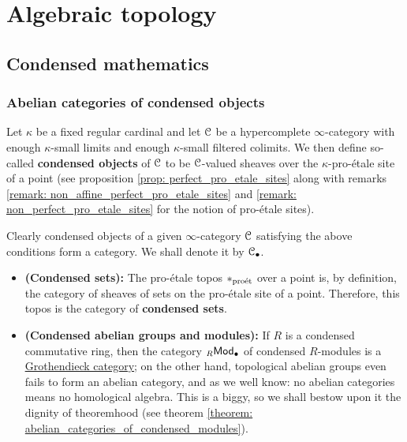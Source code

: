 \chapter{Algebraic topology}
    \begin{abstract}
        
    \end{abstract}
    
    \minitoc
    
    \section{Condensed mathematics} \label{section: condensed_mathematics}
        \subsection{Abelian categories of condensed objects}
            \begin{definition}[Condensation] \label{def: condensation}
                Let $\kappa$ be a fixed regular cardinal and let $\mathcal{C}$ be a hypercomplete $\infty$-category with enough $\kappa$-small limits and enough $\kappa$-small filtered colimits. We then define so-called \textbf{condensed objects} of $\mathcal{C}$ to be $\mathcal{C}$-valued sheaves over the $\kappa$-pro-\'etale site of a point (see proposition \ref{prop: perfect_pro_etale_sites} along with remarks \ref{remark: non_affine_perfect_pro_etale_sites} and \ref{remark: non_perfect_pro_etale_sites} for the notion of pro-\'etale sites).  
                
                Clearly condensed objects of a given $\infty$-category $\mathcal{C}$ satisfying the above conditions form a category. We shall denote it by $\mathcal{C}_{\bullet}$.
            \end{definition}
            \begin{example}
                \noindent
                \begin{itemize}
                    \item \textbf{(Condensed sets):} The pro-\'etale topos $*_{\mathrm{pro\acute{e}t}}$ over a point is, by definition, the category of sheaves of sets on the pro-\'etale site of a point. Therefore, this topos is the category of \textbf{condensed sets}.
                    \item \textbf{(Condensed abelian groups and modules):} If $R$ is a condensed commutative ring, then the category ${}_R\mathsf{Mod}_{\bullet}$ of condensed $R$-modules is a \href{https://ncatlab.org/nlab/show/Grothendieck+category}{\underline{Grothendieck category}}; on the other hand, topological abelian groups even fails to form an abelian category, and as we well know: no abelian categories means no homological algebra. This is a biggy, so we shall bestow upon it the dignity of theoremhood (see theorem \ref{theorem: abelian_categories_of_condensed_modules}).
                \end{itemize}
            \end{example}
